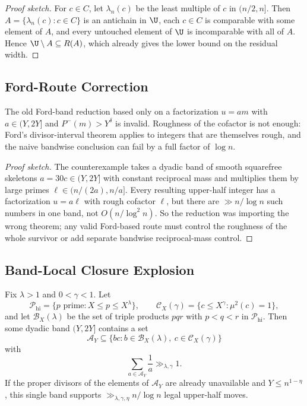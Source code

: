 \begin{proof}[Proof sketch]
For $c\in C$, let $\lambda_n(c)$ be the least multiple of $c$ in $(n/2,n]$.
Then $A=\{\lambda_n(c):c\in C\}$ is an antichain in $\U$, each $c\in C$ is
comparable with some element of $A$, and every untouched element of $\U$ is
incomparable with all of $A$.  Hence $\U\setminus A\subseteq R(A)$, which
already gives the lower bound on the residual width.
\end{proof}

\subsection{Ford-Route Correction}

\begin{proposition}\label{prop:ford-correction}
The old Ford-band reduction based only on a factorization
$u=am$ with $a\in (Y,2Y]$ and $P^-(m)>Y^\delta$ is invalid.  Roughness of the
cofactor is not enough: Ford's divisor-interval theorem applies to integers
that are themselves rough, and the naive bandwise conclusion can fail by a full
factor of $\log n$.
\end{proposition}

\begin{proof}[Proof sketch]
The counterexample takes a dyadic band of smooth squarefree skeletons
$a=30c\in (Y,2Y]$ with constant reciprocal mass and multiplies them by large
primes $\ell\in (n/(2a),n/a]$.  Every resulting upper-half integer has a
factorization $u=a\ell$ with rough cofactor $\ell$, but there are
$\gg n/\log n$ such numbers in one band, not $O(n/\log^2 n)$.  So the reduction
was importing the wrong theorem; any valid Ford-based route must control the
roughness of the whole survivor or add separate bandwise reciprocal-mass
control.
\end{proof}

\subsection{Band-Local Closure Explosion}

\begin{proposition}\label{prop:band-local-explosion}
Fix $\lambda>1$ and $0<\gamma<1$.  Let
\[
\mathcal P_{\mathrm{hi}}=\{p\text{ prime}:X\le p\le X^\lambda\},
\qquad
\mathcal C_X(\gamma)=\{c\le X^\gamma:\mu^2(c)=1\},
\]
and let $\mathcal B_X(\lambda)$ be the set of triple products $pqr$ with
$p<q<r$ in $\mathcal P_{\mathrm{hi}}$.  Then some dyadic band $(Y,2Y]$ contains
a set
\[
\mathcal A_Y\subseteq \{bc:b\in\mathcal B_X(\lambda),\ c\in\mathcal C_X(\gamma)\}
\]
with
\[
\sum_{a\in\mathcal A_Y}\frac1a\gg_{\lambda,\gamma} 1.
\]
If the proper divisors of the elements of $\mathcal A_Y$ are already
unavailable and $Y\le n^{1-\eta}$, this single band supports
$\gg_{\lambda,\gamma,\eta} n/\log n$ legal upper-half moves.
\end{proposition}

